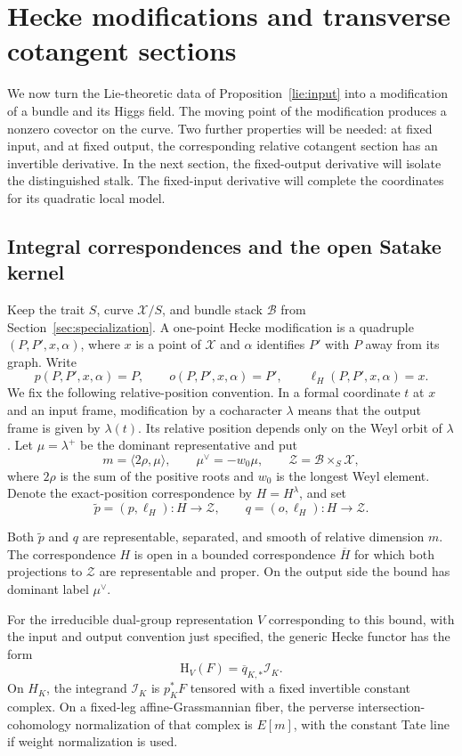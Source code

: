 \section{Hecke modifications and transverse cotangent sections}
\label{sec:hecke}

We now turn the Lie-theoretic data of Proposition~\ref{lie:input} into a
modification of a bundle and its Higgs field.  The moving point of the
modification produces a nonzero covector on the curve.  Two further
properties will be needed: at fixed input, and at fixed output, the
corresponding relative cotangent section has an invertible derivative.
In the next section, the fixed-output derivative will isolate the
distinguished stalk. The fixed-input derivative will complete the
coordinates for its quadratic local model.

\subsection{Integral correspondences and the open Satake kernel}

Keep the trait $S$, curve $\mathscr X/S$, and bundle stack $\mathcal B$
from Section~\ref{sec:specialization}.  A one-point Hecke modification is a
quadruple $(P,P',x,\alpha)$, where $x$ is a point of $\mathscr X$ and
$\alpha$ identifies $P'$ with $P$ away from its graph.  Write
\[
 p(P,P',x,\alpha)=P,\qquad o(P,P',x,\alpha)=P',\qquad
 \ell_H(P,P',x,\alpha)=x.
\]
We fix the following relative-position convention.  In a formal coordinate
$t$ at $x$ and an input frame, modification by a cocharacter $\lambda$
means that the output frame is given by $\lambda(t)$.  Its relative
position depends only on the Weyl orbit of $\lambda$.  Let
$\mu=\lambda^+$ be the dominant representative and put
\[
 m=\langle 2\rho,\mu\rangle,
 \qquad \mu^\vee=-w_0\mu,
 \qquad \mathcal Z=\mathcal B\times_S\mathscr X,
\]
where $2\rho$ is the sum of the positive roots and $w_0$ is the longest
Weyl element.  Denote the exact-position correspondence by $H=H^\lambda$,
and set
\[
 \widetilde p=(p,\ell_H):H\longrightarrow\mathcal Z,
 \qquad q=(o,\ell_H):H\longrightarrow\mathcal Z.
\]

\begin{lemma}\label{hecke:models}
Both $\widetilde p$ and $q$ are representable, separated, and smooth of
relative dimension $m$.  The correspondence $H$ is open in a bounded
correspondence $\overline H$ for which both projections to $\mathcal Z$
are representable and proper.  On the output side the bound has dominant
label $\mu^\vee$.

For the irreducible dual-group representation $V$ corresponding to this
bound, with the input and output convention just specified, the generic
Hecke functor has the form
\begin{equation}\label{hecke:kernel}
 \mathrm H_V(F)=\overline q_{K,*}\mathcal I_K.
\end{equation}
On $H_K$, the integrand $\mathcal I_K$ is $p_K^*F$ tensored with a fixed
invertible constant complex.  On a fixed-leg affine-Grassmannian fiber,
the perverse intersection-cohomology normalization of that complex is
$E[m]$, with the constant Tate line if weight normalization is used.
\end{lemma}

